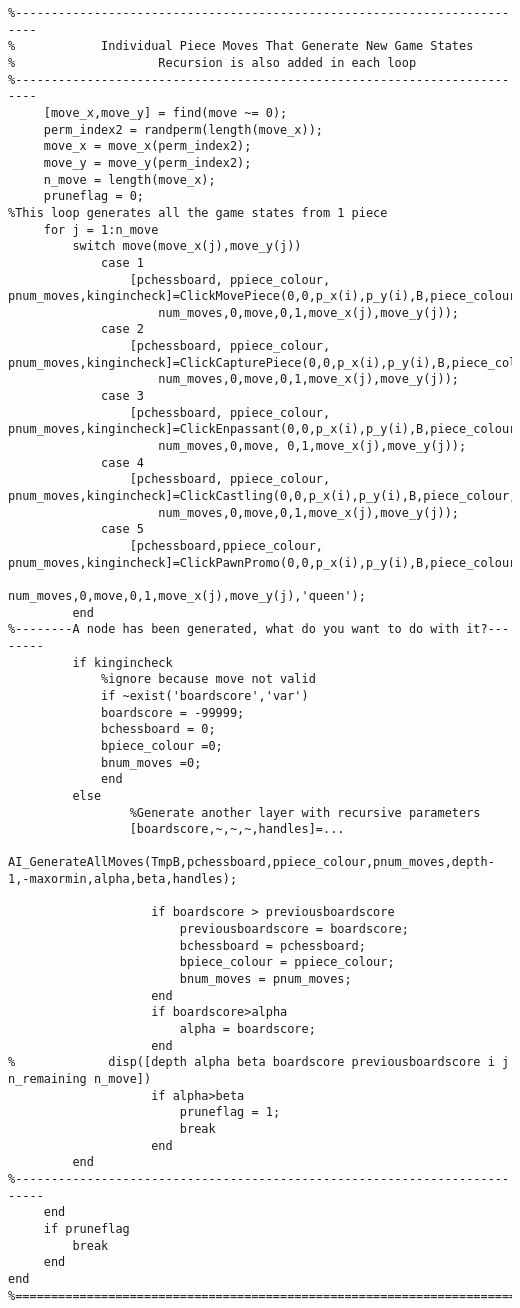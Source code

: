 \documentclass{article}
\begin{document}
\begin{lstlisting}
%-------------------------------------------------------------------------
%            Individual Piece Moves That Generate New Game States
%                    Recursion is also added in each loop
%-------------------------------------------------------------------------
     [move_x,move_y] = find(move ~= 0);
     perm_index2 = randperm(length(move_x));
     move_x = move_x(perm_index2);
     move_y = move_y(perm_index2);
     n_move = length(move_x);
     pruneflag = 0;
%This loop generates all the game states from 1 piece
     for j = 1:n_move
         switch move(move_x(j),move_y(j))
             case 1
                 [pchessboard, ppiece_colour, pnum_moves,kingincheck]=ClickMovePiece(0,0,p_x(i),p_y(i),B,piece_colour,chessboard,...
                     num_moves,0,move,0,1,move_x(j),move_y(j));
             case 2
                 [pchessboard, ppiece_colour, pnum_moves,kingincheck]=ClickCapturePiece(0,0,p_x(i),p_y(i),B,piece_colour,chessboard,...
                     num_moves,0,move,0,1,move_x(j),move_y(j));
             case 3
                 [pchessboard, ppiece_colour, pnum_moves,kingincheck]=ClickEnpassant(0,0,p_x(i),p_y(i),B,piece_colour,chessboard,...
                     num_moves,0,move, 0,1,move_x(j),move_y(j));
             case 4
                 [pchessboard, ppiece_colour, pnum_moves,kingincheck]=ClickCastling(0,0,p_x(i),p_y(i),B,piece_colour,chessboard,...
                     num_moves,0,move,0,1,move_x(j),move_y(j));
             case 5
                 [pchessboard,ppiece_colour, pnum_moves,kingincheck]=ClickPawnPromo(0,0,p_x(i),p_y(i),B,piece_colour,chessboard,...
                     num_moves,0,move,0,1,move_x(j),move_y(j),'queen');
         end
%--------A node has been generated, what do you want to do with it?--------
         if kingincheck  
             %ignore because move not valid
             if ~exist('boardscore','var')
             boardscore = -99999;
             bchessboard = 0;
             bpiece_colour =0;
             bnum_moves =0;
             end
         else
                 %Generate another layer with recursive parameters
                 [boardscore,~,~,~,handles]=...
            AI_GenerateAllMoves(TmpB,pchessboard,ppiece_colour,pnum_moves,depth-1,-maxormin,alpha,beta,handles);
    
                    if boardscore > previousboardscore
                        previousboardscore = boardscore;
                        bchessboard = pchessboard;
                        bpiece_colour = ppiece_colour;
                        bnum_moves = pnum_moves;
                    end
                    if boardscore>alpha
                        alpha = boardscore;
                    end
%             disp([depth alpha beta boardscore previousboardscore i j n_remaining n_move])
                    if alpha>beta
                        pruneflag = 1;
                        break
                    end
         end
%--------------------------------------------------------------------------
     end
     if pruneflag
         break
     end
end
%=========================================================================



\end{lstlisting}
\end{document}
